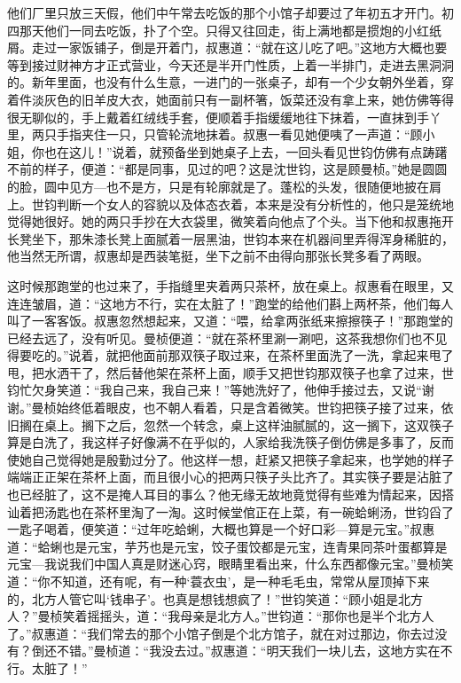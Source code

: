 \par 他们厂里只放三天假，他们中午常去吃饭的那个小馆子却要过了年初五才开门。初四那天他们一同去吃饭，扑了个空。只得又往回走，街上满地都是掼炮的小红纸屑。走过一家饭铺子，倒是开着门，叔惠道：“就在这儿吃了吧。”这地方大概也要等到接过财神方才正式营业，今天还是半开门性质，上着一半排门，走进去黑洞洞的。新年里面，也没有什么生意，一进门的一张桌子，却有一个少女朝外坐着，穿着件淡灰色的旧羊皮大衣，她面前只有一副杯箸，饭菜还没有拿上来，她仿佛等得很无聊似的，手上戴着红绒线手套，便顺着手指缓缓地往下抹着，一直抹到手丫里，两只手指夹住一只，只管轮流地抹着。叔惠一看见她便咦了一声道：“顾小姐，你也在这儿！”说着，就预备坐到她桌子上去，一回头看见世钧仿佛有点踌躇不前的样子，便道：“都是同事，见过的吧？这是沈世钧，这是顾曼桢。”她是圆圆的脸，圆中见方—也不是方，只是有轮廓就是了。蓬松的头发，很随便地披在肩上。世钧判断一个女人的容貌以及体态衣着，本来是没有分析性的，他只是笼统地觉得她很好。她的两只手抄在大衣袋里，微笑着向他点了个头。当下他和叔惠拖开长凳坐下，那朱漆长凳上面腻着一层黑油，世钧本来在机器间里弄得浑身稀脏的，他当然无所谓，叔惠却是西装笔挺，坐下之前不由得向那张长凳多看了两眼。
\par 这时候那跑堂的也过来了，手指缝里夹着两只茶杯，放在桌上。叔惠看在眼里，又连连皱眉，道：“这地方不行，实在太脏了！”跑堂的给他们斟上两杯茶，他们每人叫了一客客饭。叔惠忽然想起来，又道：“喂，给拿两张纸来擦擦筷子！”那跑堂的已经去远了，没有听见。曼桢便道：“就在茶杯里涮一涮吧，这茶我想你们也不见得要吃的。”说着，就把他面前那双筷子取过来，在茶杯里面洗了一洗，拿起来甩了甩，把水洒干了，然后替他架在茶杯上面，顺手又把世钧那双筷子也拿了过来，世钧忙欠身笑道：“我自己来，我自己来！”等她洗好了，他伸手接过去，又说“谢谢。”曼桢始终低着眼皮，也不朝人看着，只是含着微笑。世钧把筷子接了过来，依旧搁在桌上。搁下之后，忽然一个转念，桌上这样油腻腻的，这一搁下，这双筷子算是白洗了，我这样子好像满不在乎似的，人家给我洗筷子倒仿佛是多事了，反而使她自己觉得她是殷勤过分了。他这样一想，赶紧又把筷子拿起来，也学她的样子端端正正架在茶杯上面，而且很小心的把两只筷子头比齐了。其实筷子要是沾脏了也已经脏了，这不是掩人耳目的事么？他无缘无故地竟觉得有些难为情起来，因搭讪着把汤匙也在茶杯里淘了一淘。这时候堂倌正在上菜，有一碗蛤蜊汤，世钧舀了一匙子喝着，便笑道：“过年吃蛤蜊，大概也算是一个好口彩—算是元宝。”叔惠道：“蛤蜊也是元宝，芋艿也是元宝，饺子蛋饺都是元宝，连青果同茶叶蛋都算是元宝—我说我们中国人真是财迷心窍，眼睛里看出来，什么东西都像元宝。”曼桢笑道：“你不知道，还有呢，有一种‘蓑衣虫’，是一种毛毛虫，常常从屋顶掉下来的，北方人管它叫‘钱串子’。也真是想钱想疯了！”世钧笑道：“顾小姐是北方人？”曼桢笑着摇摇头，道：“我母亲是北方人。”世钧道：“那你也是半个北方人了。”叔惠道：“我们常去的那个小馆子倒是个北方馆子，就在对过那边，你去过没有？倒还不错。”曼桢道：“我没去过。”叔惠道：“明天我们一块儿去，这地方实在不行。太脏了！”
